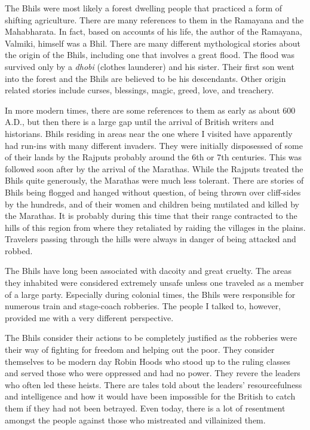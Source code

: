 \documentclass[report.tex]{subfiles}
\begin{document}
The Bhils were most likely a forest dwelling people that practiced a form of shifting agriculture. There are many references to them in the Ramayana and the Mahabharata. In fact, based on accounts of his life, the author of the Ramayana, Valmiki, himself was a Bhil. There are many different mythological stories about the origin of the Bhils, including one that involves a great flood. The flood was survived only by a \textit{dhobi} (clothes launderer) and his sister. Their first son went into the forest and the Bhils are believed to be his descendants. Other origin related stories include curses, blessings, magic, greed, love, and treachery.

In more modern times, there are some references to them as early as about 600 A.D., but then there is a large gap until the arrival of British writers and historians. Bhils residing in areas near the one where I visited have apparently had run-ins with many different invaders. They were initially disposessed of some of their lands by the Rajputs probably around the 6th or 7th centuries. This was followed soon after by the arrival of the Marathas. While the Rajputs treated the Bhils quite generously, the Marathas were much less tolerant. There are stories of Bhils being flogged and hanged without question, of being thrown over cliff-sides by the hundreds, and of their women and children being mutilated and killed by the Marathas. It is probably during this time that their range contracted to the hills of this region from where they retaliated by raiding the villages in the plains. Travelers passing through the hills were always in danger of being attacked and robbed.

The Bhils have long been associated with dacoity and great cruelty. The areas they inhabited were considered extremely unsafe unless one traveled as a member of a large party. Especially during colonial times, the Bhils were responsible for numerous train and stage-coach robberies. The people I talked to, however, provided me with a very different perspective.

The Bhils consider their actions to be completely justified as the robberies were their way of fighting for freedom and helping out the poor. They consider themselves to be modern day Robin Hoods who stood up to the ruling classes and served those who were oppressed and had no power. They revere the leaders who often led these heists. There are tales told about the leaders' resourcefulness and intelligence and how it would have been impossible for the British to catch them if they had not been betrayed. Even today, there is a lot of resentment amongst the people against those who mistreated and villainized them.
\end{document}

